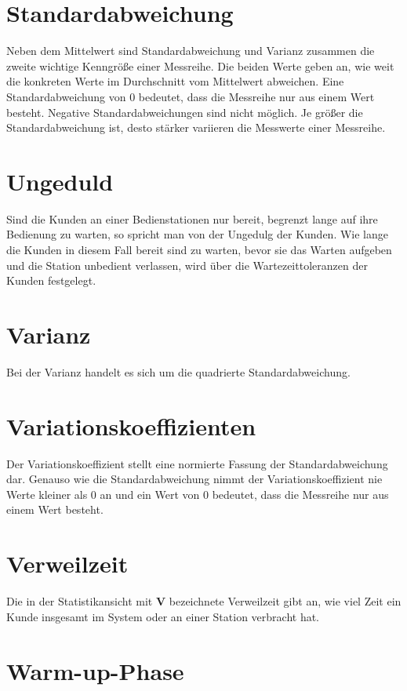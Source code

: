 \section*{Standardabweichung}


Neben dem Mittelwert sind
Standardabweichung und Varianz zusammen die zweite wichtige Kenngröße
einer Messreihe. Die beiden Werte geben an, wie weit die konkreten
Werte im Durchschnitt vom Mittelwert abweichen. Eine Standardabweichung
von 0 bedeutet, dass die Messreihe nur aus einem Wert besteht. Negative
Standardabweichungen sind nicht möglich. Je größer die Standardabweichung
ist, desto stärker variieren die Messwerte einer Messreihe.

\section*{Ungeduld}


Sind die Kunden an einer Bedienstationen nur bereit, begrenzt lange auf
ihre Bedienung zu warten, so spricht man von der Ungedulg der Kunden. Wie lange die Kunden in diesem Fall bereit
sind zu warten, bevor sie das Warten aufgeben und die Station unbedient verlassen, wird über die Wartezeittoleranzen
der Kunden festgelegt.

\section*{Varianz}


Bei der Varianz handelt es sich um die quadrierte Standardabweichung.

\section*{Variationskoeffizienten}


Der Variationskoeffizient stellt eine normierte Fassung der
Standardabweichung
dar. Genauso wie die Standardabweichung nimmt der Variationskoeffizient
nie Werte kleiner als 0 an und ein Wert von 0 bedeutet, dass die
Messreihe nur aus einem Wert besteht.

\section*{Verweilzeit}


Die in der Statistikansicht mit \textbf{V} bezeichnete Verweilzeit
gibt an, wie viel Zeit ein Kunde insgesamt im System oder an einer Station verbracht hat.

\section*{Warm-up-Phase}


